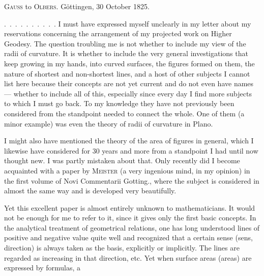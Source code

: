 \par{}
\begin{center}\textsc{Gauss} to \textsc{Olbers}. Göttingen, 30 October 1825.\end{center}
\indent\mbox{. . . . . . . . . .} I must have expressed myself unclearly in my letter about my reservations concerning the arrangement of my projected work on Higher Geodesy. The question troubling me is not whether to include my view of the radii of curvature. It is whether to include the very general investigations that keep growing in my hands, into curved surfaces, the figures formed on them, the nature of shortest and non-shortest lines, and a host of other subjects I cannot list here because their concepts are not yet current and do not even have names --- whether to include all of this, especially since every day I find more subjects to which I must go back. To my knowledge they have not previously been considered from the standpoint needed to connect the whole. One of them (a minor example) was even the theory of radii of curvature in Plano.

I might also have mentioned the theory of the area of figures in general, which I likewise have considered for 30 years and more from a standpoint I had until now thought new. I was partly mistaken about that. Only recently did I become acquainted with a paper by \textsc{Meister} (a very ingenious mind, in my opinion) in the first volume of Novi Commentarii Gotting., where the subject is considered in almost the same way and is developed very beautifully.

Yet this excellent paper is almost entirely unknown to mathematicians. It would not be enough for me to refer to it, since it gives only the first basic concepts. In the analytical treatment of geometrical relations, one has long understood lines of positive and negative value quite well and recognized that a certain sense (sens, direction) is always taken as the basis, explicitly or implicitly. The lines are regarded as increasing in that direction, etc. Yet when surface areas (areas) are expressed by formulas, a %
